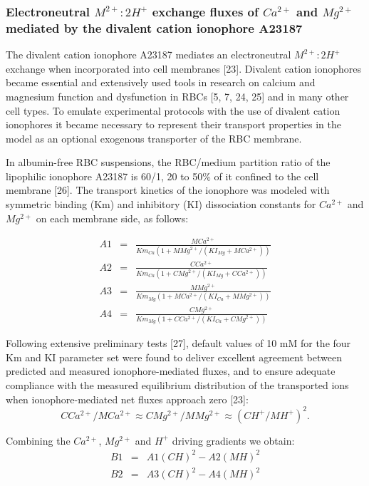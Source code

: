 \documentclass[a4paper]{article}
\newcommand{\med}[1]{M#1}
\newcommand{\cell}[1]{C#1}
\newcommand{\MCatp}{\med{Ca^{2+}}}
\newcommand{\MMgtp}{\med{Mg^{2+}}}
\newcommand{\MH}{\med{H}}
\newcommand{\Km}[1]{Km_{#1}}
\newcommand{\KI}[1]{KI_{#1}}
\newcommand{\CH}{\cell{H}}
\newcommand{\CMgtp}{\cell{Mg^{2+}}}
\newcommand{\CCatp}{\cell{Ca^{2+}}}
\begin{document}
\subsubsection{Electroneutral $M^{2+}:2H^+$ exchange fluxes of $Ca^{2+}$ and $Mg^{2+}$ mediated by the divalent cation ionophore A23187}

The divalent cation ionophore A23187 mediates an electroneutral $M^{2+}:2H^+$ exchange when incorporated into cell membranes [23]. Divalent cation ionophores became essential and extensively used tools in research on calcium and magnesium function and dysfunction in RBCs [5, 7, 24, 25] and in many other cell types. To emulate experimental protocols with the use of divalent cation ionophores it became necessary to represent their transport properties in the model as an optional exogenous transporter of the RBC membrane.  

In albumin-free RBC suspensions, the RBC/medium partition ratio of the lipophilic ionophore A23187 is 60/1, 20 to 50\% of it confined to the cell membrane [26].  The transport kinetics of the ionophore was modeled with symmetric binding (Km) and inhibitory (KI) dissociation constants for $Ca^{2+}$ and $Mg^{2+}$ on each membrane side, as follows:


\begin{eqnarray}
\nonumber A1 &=& \frac{\MCatp}{\Km{Ca}(1 + \MMgtp/(\KI{Mg} + \MCatp))} \\
\nonumber A2 &=& \frac{\CCatp}{\Km{Ca}(1 + \CMgtp/(\KI{Mg} + \CCatp))}  \\
\nonumber A3 &=& \frac{\MMgtp}{\Km{Mg}(1 + \MCatp/(\KI{Ca} + \MMgtp))}  \\
\nonumber A4 &=& \frac{\CMgtp}{\Km{Mg}(1 + \CCatp/(\KI{Ca} + \CMgtp))} 
\end{eqnarray}

Following extensive preliminary tests [27], default values of 10 mM for the four Km and KI parameter set were found to deliver excellent agreement between predicted and measured ionophore-mediated fluxes, and to ensure adequate compliance with the measured equilibrium distribution of the transported ions when ionophore-mediated net fluxes approach zero [23]: 
\[\CCatp/\MCatp \approx \CMgtp/\MMgtp \approx (\CH^+/\MH^+)^2.\]

Combining the $Ca^{2+}$, $Mg^{2+}$ and $H^+$ driving gradients we obtain:
\begin{eqnarray}
\nonumber B1&=& A1(\CH)^2 - A2(\MH)^2 \\
\nonumber B2&=& A3(\CH)^2 - A4(\MH)^2
\end{eqnarray}
\end{document}
